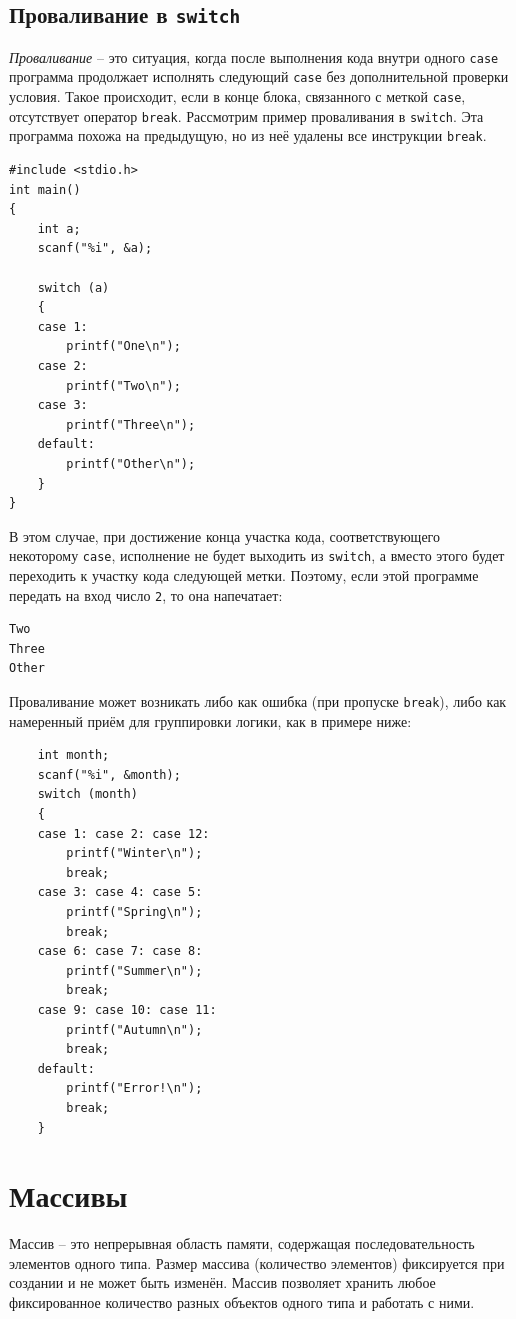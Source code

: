 \documentclass[10pt]{article}
\begin{document}
\subsection*{Проваливание в \texttt{switch}}
\textit{Проваливание} -- это ситуация, когда после выполнения кода внутри одного \texttt{case} программа продолжает исполнять следующий \texttt{case} без дополнительной проверки условия. Такое происходит, если в конце блока, связанного с меткой \texttt{case}, отсутствует оператор \texttt{break}.
Рассмотрим пример проваливания в \texttt{switch}. Эта программа похожа на предыдущую, но из неё удалены все инструкции \texttt{break}.
\begin{lstlisting}
#include <stdio.h>
int main() 
{
    int a;
    scanf("%i", &a);

    switch (a) 
    {
    case 1:
		printf("One\n");
	case 2:
		printf("Two\n");
	case 3:
  		printf("Three\n");
	default:
		printf("Other\n");
    }
}
\end{lstlisting}
В этом случае, при достижение конца участка кода, соответствующего некоторому \texttt{case}, исполнение не будет выходить из \texttt{switch}, а вместо этого будет переходить к участку кода следующей метки. Поэтому, если этой программе передать на вход число \texttt{2}, то она напечатает:
\begin{verbatim}
Two
Three
Other
\end{verbatim}
Проваливание может возникать либо как ошибка (при пропуске \texttt{break}), либо как намеренный приём для группировки логики, как в примере ниже:
\begin{lstlisting}
    int month;
    scanf("%i", &month);
    switch (month)
    {
    case 1: case 2: case 12:
    	printf("Winter\n");
    	break;
    case 3: case 4: case 5:
    	printf("Spring\n");
    	break;
    case 6: case 7: case 8:
    	printf("Summer\n");
    	break;
    case 9: case 10: case 11:
    	printf("Autumn\n");
    	break;
    default:
        printf("Error!\n");
        break;
    }
\end{lstlisting}


\newpage
\section*{Массивы}
Массив -- это непрерывная область памяти, содержащая последовательность элементов одного типа. Размер массива (количество элементов) фиксируется при создании и не может быть изменён. Массив позволяет хранить любое фиксированное количество разных объектов одного типа и работать с ними.
\end{document}

